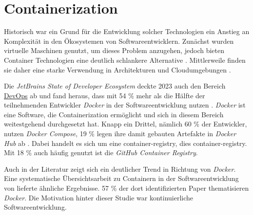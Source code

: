 \section{Containerization}
\label{sec:02-03_containerization}

 \cite{023:Setting-up-CI-CD-Pipeline-in-the-Cloud-for-Web-Application}

Historisch war ein Grund für die Entwicklung solcher Technologien ein Anstieg an Komplexität in den Ökosystemen von Softwareentwicklern. Zunächst wurden virtuelle Maschinen genutzt, um dieses Problem anzugehen, jedoch bieten Container Technologien eine deutlich schlankere Alternative \cite{014:Managing-Container-based-Software-Development-Environments}. Mittlerweile finden sie daher eine starke Verwendung in  Architekturen \cite{014:Managing-Container-based-Software-Development-Environments} und Cloudumgebungen \cite{025:Exploring-Solutions-for-Container-Image-Security}.

Die \textit{JetBrains State of Developer Ecosystem} deckte 2023 auch den Bereich \hyperref[sec:03-01_devops]{DevOps} ab und fand heraus, dass mit 54 \% mehr als die Hälfte der teilnehmenden Entwickler \textit{Docker} in der Softwareentwicklung nutzen \cite{207:Developer-Ecosystem}. \textit{Docker} ist eine Software, die Containerization ermöglicht und sich in diesem Bereich weitestgehend durchgesetzt hat. Knapp ein Drittel, nämlich 60 \% der Entwickler, nutzen \textit{Docker Compose}, 19 \% legen ihre damit gebauten Artefakte in \textit{Docker Hub} ab \cite{207:Developer-Ecosystem}. Dabei handelt es sich um eine \Gls{container-registry}, dies \glsdesc{container-registry}. Mit 18 \% auch häufig genutzt ist die \textit{GitHub Container Registry}.

Auch in der Literatur zeigt sich ein deutlicher Trend in Richtung von \textit{Docker}. Eine systematische Übersichtsarbeit zu Containern in der Softwareentwicklung von \citeauthor{015:Containers-in-Software-Development} lieferte ähnliche Ergebnisse. 57 \% der dort identifizierten Paper thematisieren \textit{Docker}. Die Motivation hinter dieser Studie war kontinuierliche Softwareentwicklung. \cite{015:Containers-in-Software-Development}

